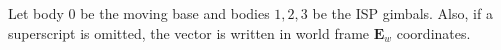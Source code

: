 %
%
%
%
%
%
%
%
%
%
Let body $0$ be the moving base and bodies $1,2,3$ be the ISP gimbals.
%
Also, if a superscript is omitted, the vector is written in world frame $\mathbf{E}_w$ coordinates.

